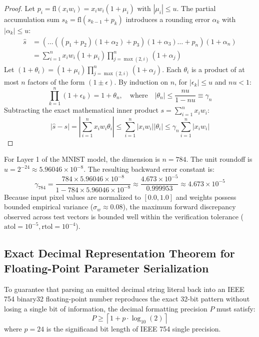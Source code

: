 \documentclass[11pt,a4paper]{article}
\begin{document}
\begin{proof}
Let $p_i = \text{fl}(x_i w_i) = x_i w_i (1 + \mu_i)$ with $|\mu_i| \le u$. The partial accumulation sum $s_k = \text{fl}(s_{k-1} + p_k)$ introduces a rounding error $\alpha_k$ with $|\alpha_k| \le u$:
\begin{align}
\hat{s} &= \left( \dots \left( (p_1 + p_2)(1 + \alpha_2) + p_3 \right)(1 + \alpha_3) \dots + p_n \right)(1 + \alpha_n) \\
&= \sum_{i=1}^n x_i w_i (1 + \mu_i) \prod_{j=\max(2, i)}^n (1 + \alpha_j)
\end{align}
Let $(1 + \theta_i) = (1 + \mu_i) \prod_{j=\max(2, i)}^n (1 + \alpha_j)$. Each $\theta_i$ is a product of at most $n$ factors of the form $(1 \pm \epsilon)$. By induction on $n$, for $|\epsilon_k| \le u$ and $n u < 1$:
\begin{equation}
\prod_{k=1}^n (1 + \epsilon_k) = 1 + \theta_n, \quad \text{where} \quad |\theta_n| \le \frac{n u}{1 - n u} \equiv \gamma_n
\end{equation}
Subtracting the exact mathematical inner product $s = \sum_{i=1}^n x_i w_i$:
\begin{equation}
|\hat{s} - s| = \left| \sum_{i=1}^n x_i w_i \theta_i \right| \le \sum_{i=1}^n |x_i w_i| |\theta_i| \le \gamma_n \sum_{i=1}^n |x_i w_i|
\end{equation}
\end{proof}

For Layer 1 of the MNIST model, the dimension is $n = 784$. The unit roundoff is $u = 2^{-24} \approx 5.96046 \times 10^{-8}$. The resulting backward error constant is:
\begin{equation}
\gamma_{784} = \frac{784 \times 5.96046 \times 10^{-8}}{1 - 784 \times 5.96046 \times 10^{-8}} \approx \frac{4.673 \times 10^{-5}}{0.999953} \approx 4.673 \times 10^{-5}
\end{equation}
Because input pixel values are normalized to $[0.0, 1.0]$ and weights possess bounded empirical variance ($\sigma_w \approx 0.08$), the maximum forward discrepancy observed across test vectors is bounded well within the verification tolerance ($\text{atol}=10^{-5}, \text{rtol}=10^{-4}$).

\subsection{Exact Decimal Representation Theorem for Floating-Point Parameter Serialization}
\label{sec:goldberg_proof}

\begin{theorem}
To guarantee that parsing an emitted decimal string literal back into an IEEE 754 binary32 floating-point number reproduces the exact 32-bit pattern without losing a single bit of information, the decimal formatting precision $P$ must satisfy:
\begin{equation}
P \ge \left\lceil 1 + p \cdot \log_{10}(2) \right\rceil
\end{equation}
where $p = 24$ is the significand bit length of IEEE 754 single precision.
\end{theorem}
\end{document}
